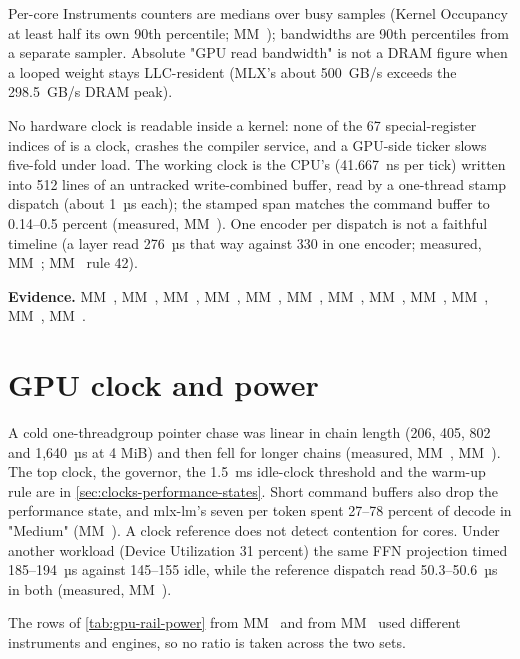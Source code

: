 Per-core Instruments counters are medians over busy samples (Kernel Occupancy at least half its own 90th percentile;
MM~); bandwidths are 90th percentiles from a separate sampler. Absolute "GPU read
bandwidth" is not a DRAM figure when a looped weight stays LLC-resident (MLX's about 500~GB/s exceeds the 298.5~GB/s
DRAM peak).

No hardware clock is readable inside a kernel: none of the 67 special-register indices of
 is a clock,  crashes the compiler service, and a GPU-side
ticker slows five-fold under load. The working clock is the CPU's  (41.667~ns per tick) written
into 512 lines of an untracked write-combined buffer, read by a one-thread stamp dispatch (about 1~µs each); the
stamped span matches the command buffer to 0.14–0.5 percent (measured, MM~). One encoder per dispatch is not
a faithful timeline (a layer read 276~µs that way against 330 in one encoder; measured, MM~; MM~
rule 42).

\textbf{Evidence.} MM~, MM~, MM~, MM~, MM~, MM~, MM~, MM~,
MM~, MM~, MM~, MM~.

\section{GPU clock and power}\label{sec:clocks-power-gpu}

A cold one-threadgroup pointer chase was linear in chain length (206, 405, 802 and 1,640~µs at 4 MiB) and then fell
for longer chains (measured, MM~, MM~). The top clock, the governor, the 1.5~ms idle-clock
threshold and the warm-up rule are in \cref{sec:clocks-performance-states}. Short command buffers also drop the
performance state, and mlx-lm's seven per token spent 27–78 percent of decode in "Medium" (MM~). A clock
reference does not detect contention for cores. Under another workload (Device Utilization 31 percent) the same FFN
projection timed 185–194~µs against 145–155 idle, while the reference dispatch read 50.3–50.6~µs in both (measured,
MM~).

The rows of \cref{tab:gpu-rail-power} from MM~ and from MM~ used different instruments and
engines, so no ratio is taken across the two sets.

